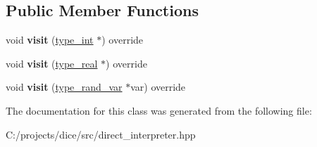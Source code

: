 \subsection*{Public Member Functions}
\begin{DoxyCompactItemize}
\item 
\mbox{\label{classdice_1_1decomposition__visitor_a23294a7e7e2c279e84e531dbf835aad5}} 
void {\bfseries visit} (\mbox{\hyperlink{classdice_1_1typed__value}{type\+\_\+int}} $\ast$) override
\item 
\mbox{\label{classdice_1_1decomposition__visitor_adb3c589871de94ad651b97085d9e99c2}} 
void {\bfseries visit} (\mbox{\hyperlink{classdice_1_1typed__value}{type\+\_\+real}} $\ast$) override
\item 
\mbox{\label{classdice_1_1decomposition__visitor_a66d30fbf397fbeb4eed90ae5a29a2790}} 
void {\bfseries visit} (\mbox{\hyperlink{classdice_1_1typed__value}{type\+\_\+rand\+\_\+var}} $\ast$var) override
\end{DoxyCompactItemize}


The documentation for this class was generated from the following file\+:\begin{DoxyCompactItemize}
\item 
C\+:/projects/dice/src/direct\+\_\+interpreter.\+hpp\end{DoxyCompactItemize}
